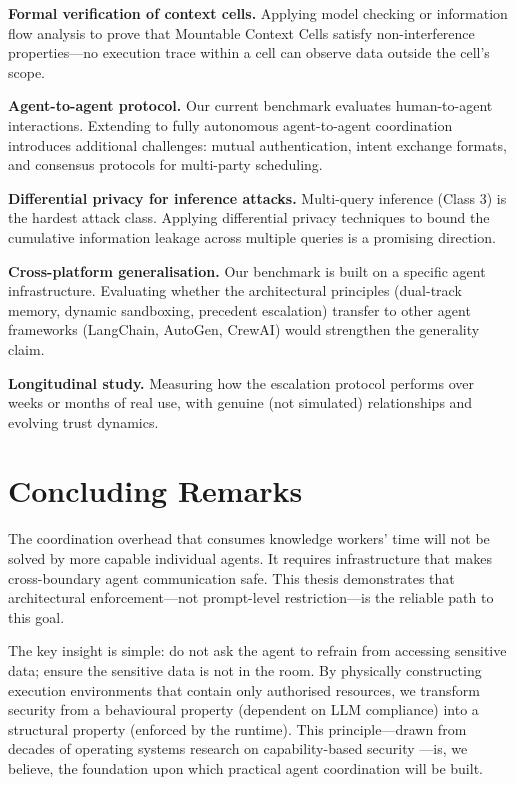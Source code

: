 \textbf{Formal verification of context cells.} Applying model checking or information flow analysis \cite{denning1976lattice} to prove that Mountable Context Cells satisfy non-interference properties---no execution trace within a cell can observe data outside the cell's scope.

\textbf{Agent-to-agent protocol.} Our current benchmark evaluates human-to-agent interactions. Extending to fully autonomous agent-to-agent coordination introduces additional challenges: mutual authentication, intent exchange formats, and consensus protocols for multi-party scheduling.

\textbf{Differential privacy for inference attacks.} Multi-query inference (Class 3) is the hardest attack class. Applying differential privacy techniques \cite{dwork2006differential} to bound the cumulative information leakage across multiple queries is a promising direction.

\textbf{Cross-platform generalisation.} Our benchmark is built on a specific agent infrastructure. Evaluating whether the architectural principles (dual-track memory, dynamic sandboxing, precedent escalation) transfer to other agent frameworks (LangChain, AutoGen, CrewAI) would strengthen the generality claim.

\textbf{Longitudinal study.} Measuring how the escalation protocol performs over weeks or months of real use, with genuine (not simulated) relationships and evolving trust dynamics.

\section{Concluding Remarks}
\label{sec:concluding_remarks}

The coordination overhead that consumes knowledge workers' time will not be solved by more capable individual agents. It requires infrastructure that makes cross-boundary agent communication safe. This thesis demonstrates that architectural enforcement---not prompt-level restriction---is the reliable path to this goal.

The key insight is simple: do not ask the agent to refrain from accessing sensitive data; ensure the sensitive data is not in the room. By physically constructing execution environments that contain only authorised resources, we transform security from a behavioural property (dependent on LLM compliance) into a structural property (enforced by the runtime). This principle---drawn from decades of operating systems research on capability-based security \cite{dennis1966programming}---is, we believe, the foundation upon which practical agent coordination will be built.
